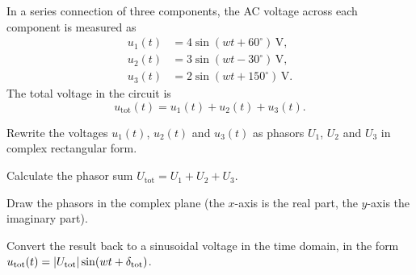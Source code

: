 In a series connection of three components, the AC voltage across each component is measured as
\begin{align*}
  u_1(t) &= 4\sin(wt + 60^{\circ})\,\text{V}, \\
  u_2(t) &= 3\sin(wt - 30^{\circ})\,\text{V}, \\
  u_3(t) &= 2\sin(wt + 150^{\circ})\,\text{V}.
\end{align*}
The total voltage in the circuit is
\[
  u_{\text{tot}}(t) = u_1(t) + u_2(t) + u_3(t).
\]
\begin{parts}
  \item Rewrite the voltages $u_1(t)$, $u_2(t)$ and $u_3(t)$ as phasors $U_1$, $U_2$ and $U_3$ in
    complex rectangular form.
  \item Calculate the phasor sum $U_{\text{tot}} = U_1 + U_2 + U_3$.
  \item Draw the phasors in the complex plane (the $x$-axis is the real part, the $y$-axis the
    imaginary part).
  \item Convert the result back to a sinusoidal voltage in the time domain, in the form
    $u_{\text{tot}}(t) = \lvert U_{\text{tot}}\rvert \sin(wt + \delta_{\text{tot}})$.
\end{parts}
